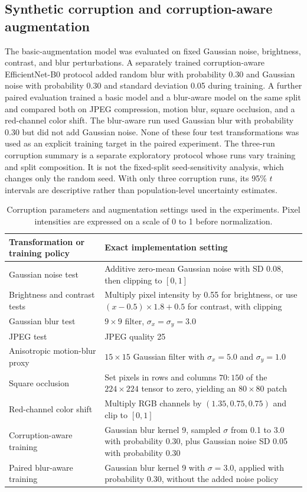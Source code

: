 \documentclass{sbc2023}%
\begin{document}
\subsection{Synthetic corruption and corruption-aware augmentation}
The basic-augmentation model was evaluated on fixed Gaussian noise, brightness, contrast, and blur perturbations. A separately trained corruption-aware EfficientNet-B0 protocol added random blur with probability 0.30 and Gaussian noise with probability 0.30 and standard deviation 0.05 during training. A further paired evaluation trained a basic model and a blur-aware model on the same split and compared both on JPEG compression, motion blur, square occlusion, and a red-channel color shift. The blur-aware run used Gaussian blur with probability 0.30 but did not add Gaussian noise. None of these four test transformations was used as an explicit training target in the paired experiment. The three-run corruption summary is a separate exploratory protocol whose runs vary training and split composition. It is not the fixed-split seed-sensitivity analysis, which changes only the random seed. With only three corruption runs, its 95\% $t$ intervals are descriptive rather than population-level uncertainty estimates.

\begin{table}[!t]
\centering
\caption{Corruption parameters and augmentation settings used in the experiments. Pixel intensities are expressed on a scale of 0 to 1 before normalization.}
\label{tab:corruption_severity}
\small
\begin{tabular}{p{}p{}}
\toprule
Transformation or training policy & Exact implementation setting \\
\midrule
Gaussian noise test & Additive zero-mean Gaussian noise with SD 0.08, then clipping to $[0,1]$ \\
Brightness and contrast tests & Multiply pixel intensity by 0.55 for brightness, or use $(x-0.5)\times1.8+0.5$ for contrast, with clipping \\
Gaussian blur test & $9\times9$ filter, $\sigma_x=\sigma_y=3.0$ \\
JPEG test & JPEG quality 25 \\
Anisotropic motion-blur proxy & $15\times15$ Gaussian filter with $\sigma_x=5.0$ and $\sigma_y=1.0$ \\
Square occlusion & Set pixels in rows and columns $70{:}150$ of the $224\times224$ tensor to zero, yielding an $80\times80$ patch \\
Red-channel color shift & Multiply RGB channels by $(1.35, 0.75, 0.75)$ and clip to $[0,1]$ \\
Corruption-aware training & Gaussian blur kernel 9, sampled $\sigma$ from 0.1 to 3.0 with probability 0.30, plus Gaussian noise SD 0.05 with probability 0.30 \\
Paired blur-aware training & Gaussian blur kernel 9 with $\sigma=3.0$, applied with probability 0.30, without the added noise policy \\
\bottomrule
\end{tabular}
\end{table}
\end{document}
